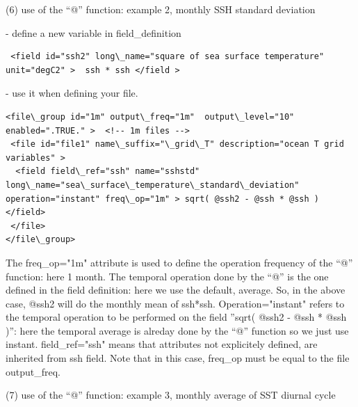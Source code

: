 (6) use of the ``@'' function: example 2, monthly SSH standard deviation

 - define a new variable in field\_definition
\vspace{-20pt}
\begin{alltt}  {{\scriptsize    
\begin{verbatim}
 <field id="ssh2" long\_name="square of sea surface temperature" unit="degC2" >  ssh * ssh </field >
\end{verbatim}
}}\end{alltt} 
 - use it when defining your file.  
\vspace{-20pt}
\begin{alltt}  {{\scriptsize    
\begin{verbatim}
<file\_group id="1m" output\_freq="1m"  output\_level="10" enabled=".TRUE." >  <!-- 1m files -->  
 <file id="file1" name\_suffix="\_grid\_T" description="ocean T grid variables" >
  <field field\_ref="ssh" name="sshstd" long\_name="sea\_surface\_temperature\_standard\_deviation" operation="instant" freq\_op="1m" > sqrt( @ssh2 - @ssh * @ssh ) </field>
 </file>
</file\_group> 
\end{verbatim}
}}\end{alltt}
The freq\_op="1m" attribute is used to define the operation frequency of the ``@'' function: here 1 month. The temporal operation done by the ``@'' is the one defined in the field definition: here we use the default, average. So, in the above case, @ssh2 will do the monthly mean of ssh*ssh. Operation="instant" refers to the temporal operation to be performed on the field ''sqrt( @ssh2 - @ssh * @ssh )'': here the temporal average is alreday done by the ``@'' function so we just use instant. field\_ref="ssh" means that attributes not explicitely defined, are inherited from ssh field. Note that in this case, freq\_op must be equal to the file output\_freq.

(7) use of the ``@'' function: example 3, monthly average of SST diurnal cycle

